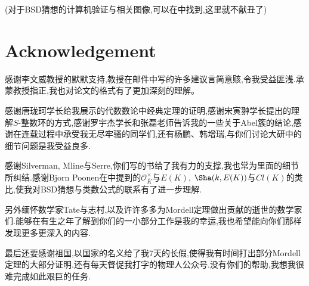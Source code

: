 \documentclass[12pt,A4paper,oneside,reqno]{amsart}
\numberwithin{equation}{section}
\theoremstyle{definition}
\theoremstyle{plain}
\theoremstyle{plain}
\numberwithin{equation}{section}
\theoremstyle{remark}
\begin{document}
(对于BSD猜想的计算机验证与相关图像,可以在\cite{johnson2015introduction}中找到,这里就不献丑了)


\section{Acknowledgement}
感谢李文威教授的默默支持,教授在邮件中写的许多建议言简意赅,令我受益匪浅.承蒙教授指正,我也对论文的格式有了更加深刻的理解。

感谢唐珑珂学长给我展示的代数数论中经典定理的证明,感谢宋寅翀学长提出的理解$S$-整数环的方式,感谢罗宇杰学长和张磊老师告诉我的一些关于Abel簇的结论,感谢在连载过程中承受我无尽牢骚的同学们,还有杨鹏、韩增瑞,与你们讨论大研中的细节问题是我受益良多.

感谢Silverman, Mline与Serre,你们写的书\cite{tate1974the,milne2006elliptic,serre1989lectures}给了我有力的支撑,我也常为里面的细节所纠结.感谢Bjorn Poonen在\cite{poonen1999selmer}中提到的$\mathcal{O}_{\bar{K}}^{\times}$与$E(K)$, $\Sha(k,E(K))$与$Cl(K)$的类比,使我对BSD猜想与类数公式的联系有了进一步理解.

另外缅怀数学家Tate与志村,以及许许多多为Mordell定理做出贡献的逝世的数学家们.能够在有生之年了解到你们的一小部分工作是我的幸运,我也希望能向你们那样发现更多更深入的内容.

最后还要感谢祖国,以国家的名义给了我7天的长假,使得我有时间打出部分Mordell定理的大部分证明.还有每天督促我打字的物理人公众号.没有你们的帮助,我想我很难完成如此艰巨的任务.

\nocite{milne1986abelian,milne1986jacobian,milne2005introduction}
\nocite{cassels1986mordell,coates2016conjecture,li2000birch,miller2011proving,poonen1999selmer,silverman1992rational,zagier1984series}







	





\end{document}
